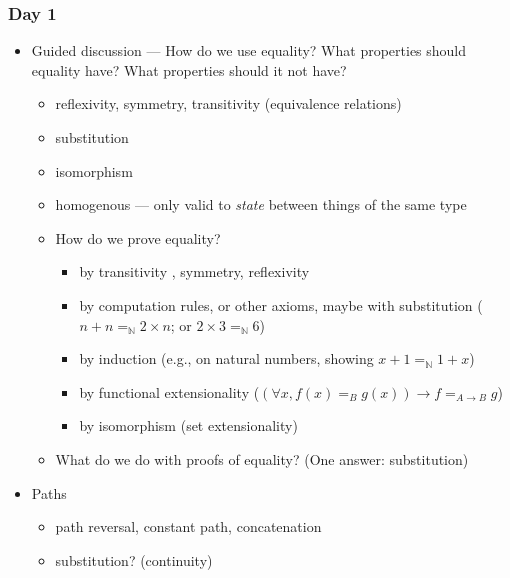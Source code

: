 \documentclass{article}
\begin{document}
\subsubsection*{Day 1}
\begin{itemize}
  \item
    Guided discussion --- How do we use equality?  What properties should equality have?  What properties should it not have?
    \begin{itemize}
      \item reflexivity, symmetry, transitivity (equivalence relations)
      \item substitution
      \item isomorphism
      \item homogenous --- only valid to \emph{state} between things of the same type
      \item How do we prove equality?
      \begin{itemize}
        \item by transitivity%
        , symmetry, reflexivity
        \item by computation rules, or other axioms, maybe with substitution ($n + n =_{\mathbb{N}} 2 \times n$; or $2 \times 3 =_{\mathbb{N}} 6$)
        \item by induction (e.g., on natural numbers, showing $x + 1 =_{\mathbb{N}} 1 + x$)
        \item by functional extensionality ($(\forall x, f(x) =_{B} g(x)) \to f =_{A \to B} g$)
        \item by isomorphism (set extensionality)
      \end{itemize}
      \item What do we do with proofs of equality?  (One answer: substitution)
    \end{itemize}
  \item
    Paths
    \begin{itemize}
      \item path reversal, constant path, concatenation
      \item substitution? (continuity)
    \end{itemize}

\end{itemize}
\end{document}
